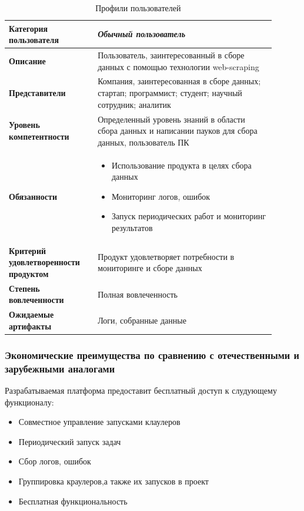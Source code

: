 \documentclass[a4paper,12pt]{article}
\begin{document}
	\begin{table}[h!]
		\centering
		\begin{tabular}{|p{0.3\linewidth}|p{0.6\linewidth}|} 
			\hline
			\textbf{Категория пользователя} & \textit{Обычный пользователь} \\ \hline
			\textbf{Описание} & Пользователь, заинтересованный в сборе данных с помощью технологии web-scraping \\ \hline
			\textbf{Представители} & Компания, заинтересованная в сборе данных; стартап; программист; студент; научный сотрудник; аналитик \\ \hline
			\textbf{Уровень компетентности} & Определенный уровень знаний в области сбора данных и написании пауков для сбора данных, пользователь ПК \\ \hline
			\textbf{Обязанности} & 
			\begin{itemize}
				\item Использование продукта в целях сбора данных
				\item Мониторинг логов, ошибок
				\item Запуск периодических работ и мониторинг результатов
			\end{itemize}  \\ \hline
			\textbf{Критерий удовлетворенности продуктом} & Продукт удовлетворяет потребности в мониторинге и сборе данных \\ \hline
			\textbf{Степень вовлеченности} & Полная вовлеченность \\ \hline
			\textbf{Ожидаемые артифакты} & Логи, собранные данные \\ \hline
		\end{tabular}
		\caption{Профили пользователей}
	\end{table}
	\clearpage
	
	
	\subsubsection{Экономические преимущества по сравнению с отечественными и зарубежными аналогами}
	 Разрабатываемая платформа предоставит бесплатный доступ к слудующему функционалу:
\begin{itemize}
    \item Совместное управление запусками клаулеров
    \item Периодический запуск задач
    \item Сбор логов, ошибок
    \item Группировка краулеров,а также их запусков в проект 
    \item Бесплатная функциональность
\end{itemize}
	
\end{document}
